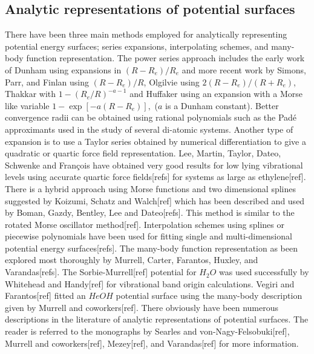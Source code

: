 \documentclass[12pt,thmsa]{article}
\begin{document}
\subsection{Analytic representations of potential surfaces}

There have been three main methods employed for analytically representing
potential energy surfaces; series expansions, interpolating schemes, and
many-body function representation. The power series approach includes the
early work of Dunham\cite{Dunham32a Dunham32b} using expansions in $%
(R-R_e)/R_e$ and more recent work by Simons, Parr, and Finlan\cite{Simons73}
using $(R-R_e)/R$, Olgilvie\cite{Olgivie81} using $2\left( R-R_e\right)
/\left( R+R_e\right) $, Thakkar\cite{Thakkar75} with $1-(R_e/R)^{-a-1}$ and
Huffaker\cite{Huffaker76} using an expansion with a Morse\cite{Morse29} like
variable $1-\exp \left[ -a\left( R-R_e\right) \right] ,$ ($a$ is a Dunham
constant). Better convergence radii can be obtained using rational
polynomials such as the Pad\'{e} approximants used in the study of several
di-atomic systems\cite{Jordan74 Jorish79 Sonnleitner81 Pardo86}. Another
type of expansion is to use a Taylor series obtained by numerical
differentiation to give a quadratic or quartic force field representation.
Lee, Martin, Taylor, Dateo, Schwenke and Fran\c{c}ois have obtained very
good results for low lying vibrational levels using accurate quartic force
fields[refs] for systems as large as ethylene[ref]. There is a hybrid
approach using Morse functions and two dimensional splines suggested by
Koizumi, Schatz and Walch[ref] which has been described and used by Boman,
Gazdy, Bentley, Lee and Dateo[refs]. This method is similar to the rotated
Morse oscillator method[ref]. Interpolation schemes using splines or
piecewise polynomials have been used for fitting single and
multi-dimensional potential energy surfaces[refs]. The many-body function
representation as been explored most thoroughly by Murrell, Carter,
Farantos, Huxley, and Varandas[refs]. The Sorbie-Murrell[ref] potential for $%
H_2O$ was used successfully by Whitehead and Handy[ref] for vibrational band
origin calculations. Vegiri and Farantos[ref] fitted an $HeOH$ potential
surface using the many-body description given by Murrell and coworkers[ref].
There obviously have been numerous descriptions in the literature of
analytic representations of potential surfaces. The reader is referred to
the monographs by Searles and von-Nagy-Felsobuki[ref], Murrell and
coworkers[ref], Mezey[ref], and Varandas[ref] for more information.
\end{document}
